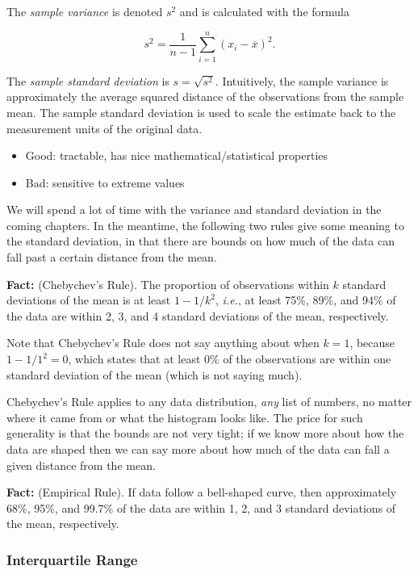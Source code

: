 \documentclass[]{book}
\providecommand{\tightlist}{%
  \setlength{\itemsep}{0pt}\setlength{\parskip}{0pt}}
\numberwithin{equation}{chapter}
\numberwithin{figure}{chapter}
\theoremstyle{plain}
\theoremstyle{definition}
\theoremstyle{remark}
\theoremstyle{definition}
\theoremstyle{definition}
\theoremstyle{remark}
\begin{document}
The \emph{sample variance} is denoted \(s^{2}\) and is calculated with
the formula

\begin{equation}
s^{2}=\frac{1}{n-1}\sum_{i=1}^{n}(x_{i}-\overline{x})^{2}.
\end{equation}

The \emph{sample standard deviation} is \(s=\sqrt{s^{2}}\). Intuitively,
the sample variance is approximately the average squared distance of the
observations from the sample mean. The sample standard deviation is used
to scale the estimate back to the measurement units of the original
data.

\begin{itemize}
\tightlist
\item
  Good: tractable, has nice mathematical/statistical properties
\item
  Bad: sensitive to extreme values
\end{itemize}

We will spend a lot of time with the variance and standard deviation in
the coming chapters. In the meantime, the following two rules give some
meaning to the standard deviation, in that there are bounds on how much
of the data can fall past a certain distance from the mean.

\textbf{Fact:} (Chebychev's Rule). The proportion of observations within
\(k\) standard deviations of the mean is at least \(1-1/k^{2}\),
\emph{i.e.}, at least 75\%, 89\%, and 94\% of the data are within 2, 3,
and 4 standard deviations of the mean, respectively.

Note that Chebychev's Rule does not say anything about when \(k=1\),
because \(1-1/1^{2}=0\), which states that at least 0\% of the
observations are within one standard deviation of the mean (which is not
saying much).

Chebychev's Rule applies to any data distribution, \emph{any} list of
numbers, no matter where it came from or what the histogram looks like.
The price for such generality is that the bounds are not very tight; if
we know more about how the data are shaped then we can say more about
how much of the data can fall a given distance from the mean.

\textbf{Fact:} (Empirical Rule). If data follow a bell-shaped curve,
then approximately 68\%, 95\%, and 99.7\% of the data are within 1, 2,
and 3 standard deviations of the mean, respectively.

\subsubsection{Interquartile Range}\label{interquartile-range}
\end{document}
